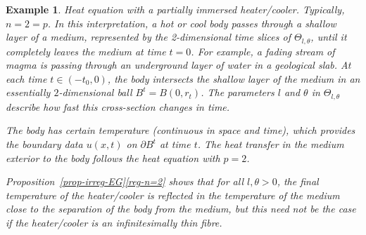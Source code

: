 \documentclass[a4paper, twoside]{article}
\theoremstyle{propositional}
\theoremstyle{descriptive}
\newtheorem{example}[thm]{Example}
\numberwithin{equation}{section}
\newcommand{\bdy}{\partial}
\begin{document}
\begin{example}  \label{ex-shallow-layer}
\emph{Heat equation with  a partially immersed heater/cooler.}
Typically, $n=2=p$.
In this interpretation, a hot or cool body
passes through a shallow layer of a medium, represented by
the 2-dimensional time slices of $\Theta_{l,\theta}$, 
until it completely leaves the medium at time $t=0$.
For example, a fading stream of magma is passing through
an underground layer of water in a geological slab.
At each time $t\in (-t_0,0)$, the body intersects the shallow layer of the medium 
in an essentially $2$-dimensional ball $B^t=B(0,r_t)$.
The parameters $l$ and $\theta$  in $\Theta_{l,\theta}$ describe
how fast this cross-section changes in time.


The body has certain temperature (continuous in space and time), 
which provides the 
boundary data $u(x,t)$ on $\bdy B^t$ at time $t$.
The heat transfer in the medium exterior to the body follows the 
heat equation with $p=2$.


Proposition~\ref{prop-irreg-EG}\ref{reg-n=2} shows that for all 
$l,\theta>0$, the final temperature of the heater/cooler is  
reflected in the temperature of the medium 
close to the separation of the body from the medium,
but this need not be the case if the heater/cooler is  an infinitesimally
thin fibre.
\end{example}
\end{document}
